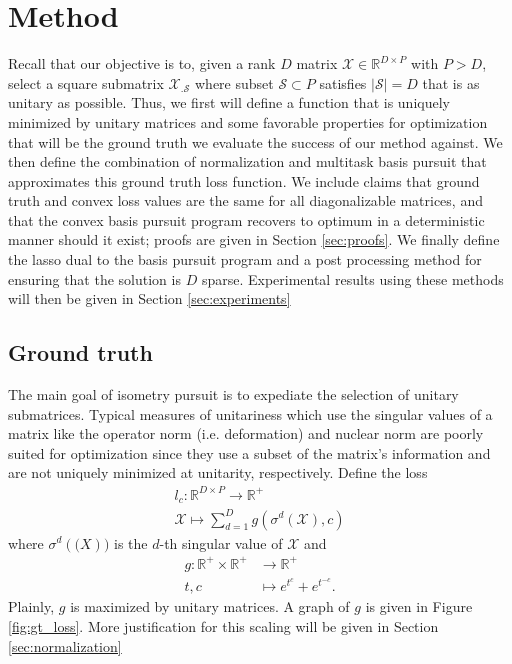 \section{Method}

Recall that our objective is to, given a rank $D$ matrix $\mathcal X \in \mathbb R^{D \times P}$ with $P > D$, select a square submatrix $\mathcal X_{.\mathcal S}$ where subset $\mathcal S \subset P$ satisfies $|\mathcal S| = D$ that is as unitary as possible.
Thus, we first will define a function that is uniquely minimized by unitary matrices and some favorable properties for optimization that will be the ground truth we evaluate the success of our method against.
We then define the combination of normalization and multitask basis pursuit that approximates this ground truth loss function.
We include claims that ground truth and convex loss values are the same for all diagonalizable matrices, and that the convex basis pursuit program recovers to optimum in a deterministic manner should it exist; proofs are given in Section \ref{sec:proofs}.
We finally define the lasso dual to the basis pursuit program and a post processing method for ensuring that the solution is $D$ sparse.
Experimental results using these methods will then be given in Section \ref{sec:experiments}

\subsection{Ground truth}
\label{sec:ground_truth}

The main goal of isometry pursuit is to expediate the selection of unitary submatrices.
Typical measures of unitariness which use the singular values of a matrix like the operator norm (i.e. deformation) and nuclear norm are poorly suited for  optimization since they use a subset of the matrix's information and are not uniquely minimized at unitarity, respectively.
Define the loss
\begin{align}
l_{c}: \mathbb R^{D \times P} \to \mathbb R^{+} \\
\mathcal X \mapsto \sum_{d = 1}^D g(\sigma^d(\mathcal X), c)
\end{align}
where $\sigma^d (\mathcal (X))$ is the $d$-th singular value of $\mathcal X$ and
\begin{align}
g: \mathbb R^+ \times \mathbb R^+ &\to \mathbb R^+ \\
t,c &\mapsto e^{t^c} + e^{t^{-c}}.
\end{align}
Plainly, $g$ is maximized by unitary matrices.
A graph of $g$ is given in Figure \ref{fig:gt_loss}.
More justification for this scaling will be given in Section \ref{sec:normalization}


